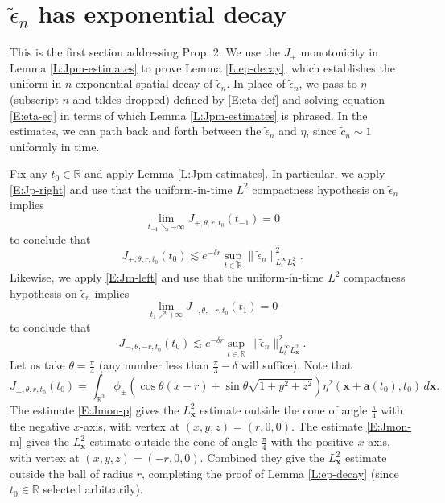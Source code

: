 \documentclass[12pt,letterpaper]{amsart}
\theoremstyle{remark}
\numberwithin{equation}{section}
\numberwithin{theorem}{section}
\numberwithin{table}{section}
\begin{document}

\section{$\tilde \epsilon_n$ has exponential decay}
\label{S:uniform-n-decay}

This is the first section addressing Prop. 2.  We use the $J_\pm$ monotonicity in Lemma \ref{L:Jpm-estimates} to prove Lemma \ref{L:ep-decay}, which establishes the uniform-in-$n$ exponential spatial decay of $\tilde \epsilon_n$.    In place of $\tilde \epsilon_n$, we pass to $\eta$ (subscript $n$ and tildes dropped) defined by \eqref{E:eta-def} and solving equation \eqref{E:eta-eq} in terms of which Lemma \ref{L:Jpm-estimates} is phrased.  In the estimates, we can path back and forth between the $\tilde \epsilon_n$ and $\eta$, since $\tilde c_n\sim 1$ uniformly in time.

Fix any $t_0\in \mathbb{R}$ and apply Lemma \ref{L:Jpm-estimates}.  In particular, we apply \eqref{E:Jp-right} and use that the uniform-in-time $L^2$ compactness hypothesis on $\tilde \epsilon_n$ implies
$$
\lim_{t_{-1} \searrow -\infty} J_{+,\theta,r,t_0}(t_{-1}) = 0$$
to conclude that 
\begin{equation}
\label{E:Jmon-p}
J_{+,\theta,r,t_0}(t_0) \lesssim e^{-\delta r} \sup_{t\in \mathbb{R}} \| \tilde \epsilon_n \|_{L_t^\infty L_{\mathbf{x}}^2}^2.
\end{equation}
Likewise, we apply \eqref{E:Jm-left} and use that the uniform-in-time $L^2$ compactness hypothesis on $\tilde \epsilon_n$ implies
$$\lim_{t_1\nearrow +\infty} J_{-,\theta,-r,t_0}(t_1) = 0$$
to conclude that
\begin{equation}
\label{E:Jmon-m}
J_{-,\theta,-r,t_0}(t_0) \lesssim e^{-\delta r} \sup_{t\in \mathbb{R}}  \| \tilde \epsilon_n \|_{L_t^\infty L_{\mathbf{x}}^2}^2.
\end{equation}
Let us take $\theta = \frac{\pi}{4}$ (any number less than $\frac{\pi}3-\delta$ will suffice).  Note that
$$
J_{\pm, \theta, r, t_0}(t_0) = \int_{\mathbb{R}^3} \phi_{\pm} (\cos\theta(x-r) + \sin\theta \sqrt{1+y^2+z^2}) \eta^2(\mathbf{x}+\mathbf{a}(t_0),t_0) \,d \mathbf{x}.
$$ 
The estimate \eqref{E:Jmon-p} gives the $L_{\mathbf{x}}^2$ estimate outside the cone of angle $\frac{\pi}{4}$ with the negative $x$-axis, with vertex at $(x,y,z) = (r,0,0)$.  The estimate \eqref{E:Jmon-m} gives the $L_{\mathbf{x}}^2$ estimate outside the cone of angle $\frac{\pi}{4}$ with the positive $x$-axis, with vertex at $(x,y,z) = (-r,0,0)$.  Combined they give the $L_{\mathbf{x}}^2$ estimate outside the ball of radius $r$, completing the proof of Lemma \ref{L:ep-decay} (since $t_0\in \mathbb{R}$ selected arbitrarily).  
\end{document}
